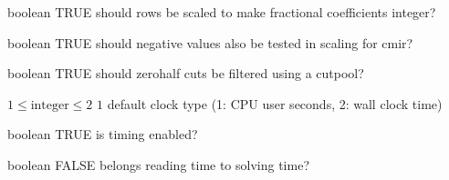 %
{boolean}%
{TRUE}%
{should rows be scaled to make fractional coefficients integer?}%
{}

%
{boolean}%
{TRUE}%
{should negative values also be tested in scaling for cmir?}%
{}

%
{boolean}%
{TRUE}%
{should zerohalf cuts be filtered using a cutpool?}%
{}

%
{$1\leq\textrm{integer}\leq2$}%
{$1$}%
{default clock type (1: CPU user seconds, 2: wall clock time)}%
{}

%
{boolean}%
{TRUE}%
{is timing enabled?}%
{}

%
{boolean}%
{FALSE}%
{belongs reading time to solving time?}%
{}

